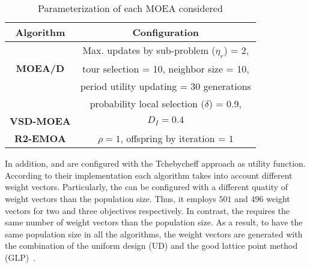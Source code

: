 %
%
%
%
%
%
%

%
\begin{table}[t]
\centering
\caption{Parameterization of each MOEA considered}
\label{tab:Parametrization}
\begin{tabular}{c|c}
\hline
\textbf{Algorithm} & \textbf{Configuration} \\ \hline
\multirow{3}{*}{\textbf{MOEA/D}} &Max. updates by sub-problem ($\eta_r$) = 2, \\
 & tour selection = 10,   neighbor size = 10, \\
 & period utility updating = 30 generations \\ 
 & probability local selection ($\delta$) = 0.9,\\ \hline
\textbf{VSD-MOEA} & $D_I=0.4$ \\ \hline
\textbf{R2-EMOA} & $\rho=1$, offspring by iteration = $1$ \\ \hline
\end{tabular}
\end{table}


%

In addition, \MOEAD{} and \RMOEA{} are configured with the Tchebycheff approach as utility function.
%
According to their implementation each algorithm takes into account different weight vectors.
%
Particularly, the \RMOEA{} can be configured with a different quatity of weight vectors than the population size.
%
Thus, it employs $501$ and $496$ weight vectors for two and three objectives respectively.
%
In contrast, the \MOEAD{} requires the same number of weight vectors than the population size.
%
As a result, to have the same population size in all the algorithms, the weight vectors are generated with the combination of the uniform design (UD) and the good lattice point method (GLP)~\cite{Joel:MOEAD_Uniform_Design, Joel:Kuhn_Munkres}.

